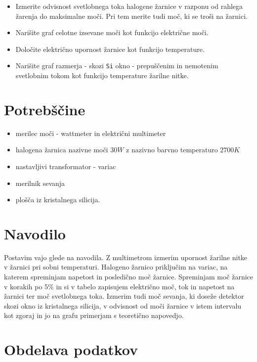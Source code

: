 \documentclass[12pt]{report}
\begin{document}
\begingroup
\let\clearpage\relax
\begin{itemize}
  \item Izmerite odvisnost svetlobnega toka halogene žarnice v razponu od rahlega žarenja do maksimalne moči. Pri tem merite tudi moč, ki se troši na žarnici. 
  \item Narišite graf celotne izsevane moči kot funkcijo električne moči. 
  \item Določite električno upornost žarnice kot funkcijo temperature. 
  \item Narišite graf razmerja - skozi \verb+Si+ okno - prepuščenim in nemotenim svetlobnim tokom kot funkcijo temperature žarilne nitke. 
\end{itemize}



\chapter*{Potrebščine}
\begin{itemize}
\item merilec moči - wattmeter in električni multimeter 
\item halogena žarnica nazivne moči $30 \si{W}$ z nazivno barvno temperaturo $2700 \si{K}$
\item nastavljivi transformator - variac 
\item merilnik sevanja 
\item plošča iz kristalnega silicija. 
\end{itemize}

\chapter*{Navodilo}

Postavim vajo glede na navodila. Z multimetrom izmerim upornost žarilne nitke v žarnici pri sobni temperaturi. Halogeno žarnico priključim na variac, na katerem spreminjam napetost in posledično moč žarnice. Spreminjam moč žarnice v korakih po 5\% in si v tabelo zapisujem električno moč, tok in napetost na žarnici ter moč svetlobnega toka. Izmerim tudi moč sevanja, ki doseže detektor skozi okno iz kristalnega silicija, v odvisnost od moči žarnice v istem intervalu kot zgoraj in jo na grafu primerjam s teoretično napovedjo. 

\endgroup


\chapter*{Obdelava podatkov}
\end{document}
